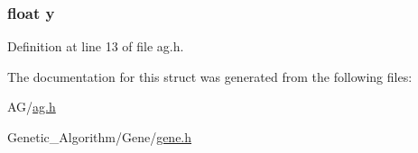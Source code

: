 \hypertarget{structgene_aa4f0d3eebc3c443f9be81bf48561a217}{}
\subsubsection[{y}]{\setlength{\rightskip}{0pt plus 5cm}float y}\label{structgene_aa4f0d3eebc3c443f9be81bf48561a217}


Definition at line 13 of file ag.\+h.



The documentation for this struct was generated from the following files\+:\begin{DoxyCompactItemize}
\item 
A\+G/\hyperlink{ag_8h}{ag.\+h}\item 
Genetic\+\_\+\+Algorithm/\+Gene/\hyperlink{gene_8h}{gene.\+h}\end{DoxyCompactItemize}
